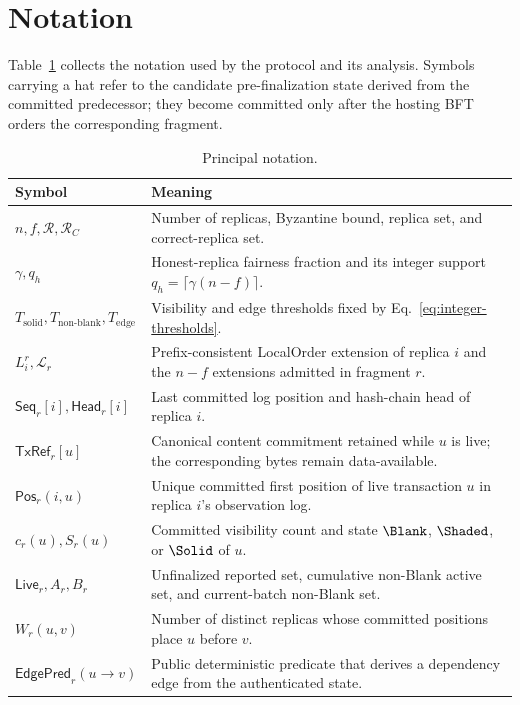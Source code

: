 \section{Notation}
\label{app:notation}

Table~\ref{tab:notation} collects the notation used by the protocol and its
analysis.  Symbols carrying a hat refer to the candidate pre-finalization
state derived from the committed predecessor; they become committed only
after the hosting BFT orders the corresponding fragment.

\begin{table}[t]
\centering
\caption{Principal notation.}
\label{tab:notation}
\renewcommand{\arraystretch}{1.08}
\begin{tabular}{p{}p{}}
\hline
\textbf{Symbol} & \textbf{Meaning} \\
\hline
$n,f,\mathcal R,\mathcal R_C$ & Number of replicas, Byzantine bound, replica set, and correct-replica set. \\
$\gamma,q_h$ & Honest-replica fairness fraction and its integer support $q_h=\lceil\gamma(n-f)\rceil$. \\
$T_{\mathrm{solid}},T_{\mathrm{non\mbox{-}blank}},T_{\mathrm{edge}}$ & Visibility and edge thresholds fixed by Eq.~\eqref{eq:integer-thresholds}. \\
$L_i^r,\mathcal L_r$ & Prefix-consistent LocalOrder extension of replica $i$ and the $n-f$ extensions admitted in fragment $r$. \\
$\mathsf{Seq}_r[i],\mathsf{Head}_r[i]$ & Last committed log position and hash-chain head of replica $i$. \\
$\mathsf{TxRef}_r[u]$ & Canonical content commitment retained while $u$ is live; the corresponding bytes remain data-available. \\
$\mathsf{Pos}_r(i,u)$ & Unique committed first position of live transaction $u$ in replica $i$'s observation log. \\
$c_r(u),S_r(u)$ & Committed visibility count and state $\Blank$, $\Shaded$, or $\Solid$ of $u$. \\
$\mathsf{Live}_r,A_r,B_r$ & Unfinalized reported set, cumulative non-Blank active set, and current-batch non-Blank set. \\
$W_r(u,v)$ & Number of distinct replicas whose committed positions place $u$ before $v$. \\
$\mathsf{EdgePred}_r(u\to v)$ & Public deterministic predicate that derives a dependency edge from the authenticated state. \\

\end{tabular}
\end{table}
